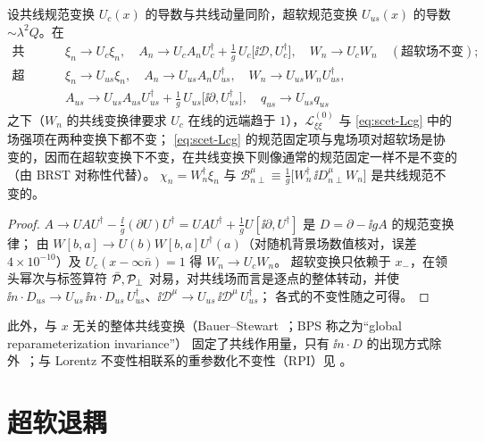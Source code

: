 \begin{proposition}[规范对称性与规范不变组元]\tagR\label{prop:scet-gauge}
设共线规范变换 $U_c(x)$ 的导数与共线动量同阶，超软规范变换 $U_{us}(x)$ 的导数 $\sim\lambda^2Q$。在
\begin{align*}
\text{共线：}&\quad \xi_n\to U_c\xi_n,\quad A_n\to U_cA_nU_c^\dagger+\tfrac1g\,U_c\big[\ii\mathcal D,U_c^\dagger\big],\quad W_n\to U_cW_n
\quad(\text{超软场不变});\\
\text{超软：}&\quad \xi_n\to U_{us}\xi_n,\quad A_n\to U_{us}A_nU_{us}^\dagger,\quad W_n\to U_{us}W_nU_{us}^\dagger,\\
&\quad A_{us}\to U_{us}A_{us}U_{us}^\dagger+\tfrac1g\,U_{us}\big[\ii\partial,U_{us}^\dagger\big],\quad q_{us}\to U_{us}q_{us}
\end{align*}
之下（$W_n$ 的共线变换律要求 $U_c$ 在线的远端趋于 $1$），$\mathcal L^{(0)}_{\xi\xi}$ 与 \cref{eq:scet-Lcg} 中的场强项在两种变换下都不变；
\cref{eq:scet-Lcg} 的规范固定项与鬼场项对超软场是协变的，因而在超软变换下不变，在共线变换下则像通常的规范固定一样不是不变的
（由 BRST 对称性代替）。
$\chi_n=W_n^\dagger\xi_n$ 与 $\mathcal B^\mu_{n\perp}\equiv\frac1g\big[W_n^\dagger\,\ii D^\mu_{n\perp}W_n\big]$ 是共线规范不变的。
\end{proposition}

\begin{proof}
$A\to UAU^\dagger-\frac{\ii}{g}(\partial U)U^\dagger=UAU^\dagger+\frac1gU[\ii\partial,U^\dagger]$ 是 $D=\partial-\ii gA$ 的规范变换律；
由 $W[b,a]\to U(b)W[b,a]U^\dagger(a)$（对随机背景场数值核对，误差 $4\times10^{-10}$）及 $U_c(x-\infty\bar n)=1$ 得 $W_n\to U_cW_n$。
超软变换只依赖于 $x_-$，在领头幂次与标签算符 $\bar{\mathcal P},\mathcal P_{\perp}$ 对易，对共线场而言是逐点的整体转动，并使
$\ii n\cdot D_{us}\to U_{us}\,\ii n\cdot D_{us}\,U_{us}^\dagger$、$\ii\mathcal D^\mu\to U_{us}\,\ii\mathcal D^\mu\,U_{us}^\dagger$；
各式的不变性随之可得。
\end{proof}

此外，与 $x$ 无关的整体共线变换（Bauer--Stewart~\cite{BauerStewart2001}；BPS 称之为“global reparameterization invariance”）
固定了共线作用量，只有 $\ii n\cdot D$ 的出现方式除外~\cite{BauerPirjolStewart2002}；与 Lorentz 不变性相联系的重参数化不变性（RPI）见 \cite{ManoharEtAl2002}。

\section{超软退耦}\label{sec:scet-decoupling}

